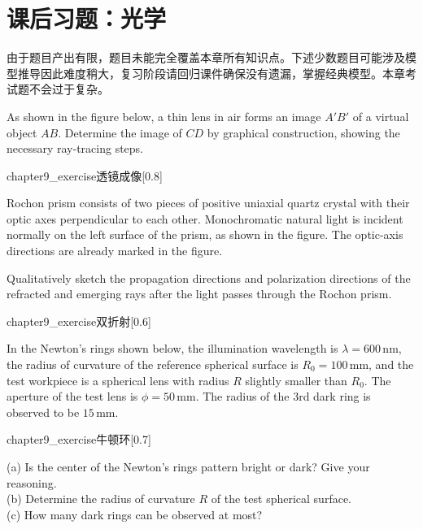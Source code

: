 \section{课后习题：光学}
由于题目产出有限，题目未能完全覆盖本章所有知识点。下述少数题目可能涉及模型推导因此难度稍大，复习阶段请回归课件确保没有遗漏，掌握经典模型。本章考试题不会过于复杂。
\begin{example}
    As shown in the figure below, a thin lens in air forms an image $A'B'$ of a virtual object $AB$. Determine the image of $CD$ by graphical construction, showing the necessary ray‑tracing steps.
    \begin{singlefigure}{chapter9_exercise透镜成像}[0.8]
    \end{singlefigure}
\end{example}

\begin{example}
    Rochon prism consists of two pieces of positive uniaxial quartz crystal with their optic axes perpendicular to each other. Monochromatic natural light is incident normally on the left surface of the prism, as shown in the figure. The optic-axis directions are already marked in the figure.

    Qualitatively sketch the propagation directions and polarization directions of the refracted and emerging rays after the light passes through the Rochon prism.
    \begin{singlefigure}{chapter9_exercise双折射}[0.6]
    \end{singlefigure}
\end{example}

\begin{example}
    In the Newton's rings shown below, the illumination wavelength is $\lambda = 600\,\text{nm}$, the radius of curvature of the reference spherical surface is $R_0 = 100\,\text{mm}$, and the test workpiece is a spherical lens with radius $R$ slightly smaller than $R_0$. The aperture of the test lens is $\phi = 50\,\text{mm}$. The radius of the 3rd dark ring is observed to be $15\,\text{mm}$.
    \begin{singlefigure}{chapter9_exercise牛顿环}[0.7]
    \end{singlefigure}

    (a) Is the center of the Newton's rings pattern bright or dark? Give your reasoning.\\
    (b) Determine the radius of curvature $R$ of the test spherical surface.\\
    (c) How many dark rings can be observed at most?
\end{example}

